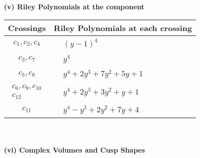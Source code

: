 \documentclass[1p]{elsarticle_modified}
\theoremstyle{definition}
\begin{document}
\newpage\renewcommand{\arraystretch}{1}
\flushleft \textbf{(v) Riley Polynomials at the component}\newline \\
\begin{tabular}{m{50pt}|m{274pt}}
Crossings & \hspace{64pt}Riley Polynomials at each crossing \\
\hline $$\begin{aligned}c_{1},c_{2},c_{4}\end{aligned}$$&$\begin{aligned}
&(y-1)^4
\end{aligned}$\\
\hline $$\begin{aligned}c_{3},c_{7}\end{aligned}$$&$\begin{aligned}
&y^4
\end{aligned}$\\
\hline $$\begin{aligned}c_{5},c_{8}\end{aligned}$$&$\begin{aligned}
&y^4+2 y^3+7 y^2+5 y+1
\end{aligned}$\\
\hline $$\begin{aligned}c_{6},c_{9},c_{10}\\c_{12}\end{aligned}$$&$\begin{aligned}
&y^4+2 y^3+3 y^2+y+1
\end{aligned}$\\
\hline $$\begin{aligned}c_{11}\end{aligned}$$&$\begin{aligned}
&y^4- y^3+2 y^2+7 y+4
\end{aligned}$\\
\hline
\end{tabular}\\~\\
\newpage\flushleft \textbf{(vi) Complex Volumes and Cusp Shapes}
\end{document}
